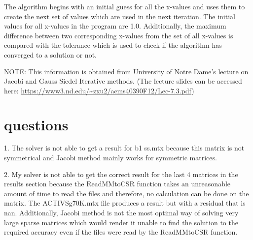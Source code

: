 \documentclass[12pt]{article}
\begin{document}
The algorithm begins with an initial guess for all the x-values and uses them to create the next set of values which are used in the next iteration. The initial values for all x-values in the program are 1$.$0. Additionally, the maximum difference between two corresponding x-values from the set of all x-values is compared with the tolerance which is used to check if the algorithm has converged to a solution or not. 

NOTE: This information is obtained from University of Notre Dame's lecture on Jacobi and Gauss Siedel Iterative methods. (The lecture slides can be accessed here: \url{https://www3.nd.edu/~zxu2/acms40390F12/Lec-7.3.pdf})



\section{questions}
1. The solver is not able to get a result for b1 ss.mtx because this matrix is not symmetrical and Jacobi method mainly works for symmetric matrices. 

2. My solver is not able to get the correct result for the last 4 matrices in the results section because the ReadMMtoCSR function takes an unreasonable amount of time to read the files and therefore, no calculation can be done on the matrix. The ACTIVSg70K$.$mtx file produces a result but with a residual that is nan. Additionally, Jacobi method is not the most optimal way of solving very large sparse matrices which would render it unable to find the solution to the required accuracy even if the files were read by the ReadMMtoCSR function.
\end{document}

